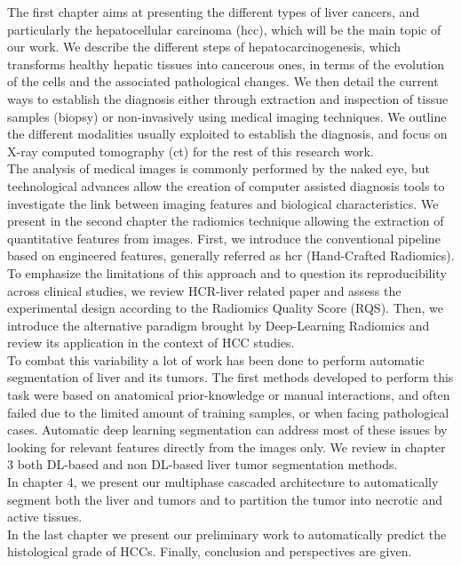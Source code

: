 The first chapter aims at presenting the different types of liver cancers, and particularly the
hepatocellular carcinoma (\ac{hcc}), which will be the main topic of our work. We describe the different steps of hepatocarcinogenesis, which
transforms healthy hepatic tissues into cancerous ones, in terms of the
evolution of the cells and the associated pathological changes. 
We then detail the current ways to establish the diagnosis either through extraction and inspection of tissue samples (biopsy) or 
non-invasively using medical imaging techniques.  We outline the different modalities usually exploited to establish the diagnosis, and focus on X-ray computed tomography (\ac{ct}) for the rest of this
research work. \\
The analysis of medical images is commonly performed by the naked eye,
but technological advances allow the creation of computer assisted
diagnosis tools to investigate the link between imaging features 
and biological characteristics.
We present in the second chapter the radiomics technique allowing the extraction of quantitative features from images. First, we introduce the conventional pipeline based on engineered features, generally referred as \ac{hcr} (Hand-Crafted Radiomics). To emphasize the limitations of this approach and to question its reproducibility across clinical studies, we review HCR-liver related paper and assess the experimental design according to the Radiomics Quality Score (RQS). Then, we introduce the alternative paradigm brought by Deep-Learning Radiomics and review its application in the context of HCC studies.\\
To combat this variability a lot of work has been done to perform
automatic segmentation of liver and its tumors.
The first methods developed to perform this task were based on
anatomical prior-knowledge or manual interactions, and often failed due to  the limited amount of training samples, or when
facing pathological cases. Automatic deep learning segmentation can address most of these issues by looking for relevant features directly from the images only. We review in chapter 3 both DL-based and non DL-based liver tumor segmentation methods.\\
In chapter 4, we present our multiphase cascaded architecture to automatically segment both the liver and tumors and to partition the tumor into necrotic and active tissues.\\
In the last chapter we present our preliminary work to automatically predict the histological grade of HCCs.
Finally, conclusion and perspectives are given.

